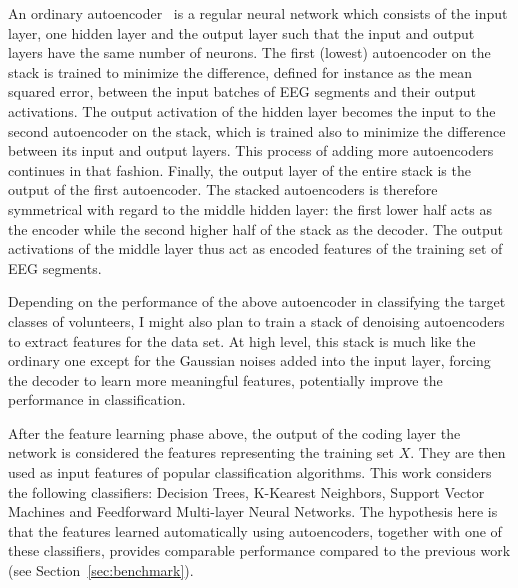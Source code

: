 \documentclass[12pt]{article}
\begin{document}
An ordinary autoencoder~\cite{bengio2007greedy} is a regular neural network which consists of the input layer, one hidden layer and the output layer such that the input and output layers have the same number of neurons. The first (lowest) autoencoder on the stack is trained to minimize the difference, defined for instance as the mean squared error, between the input batches of EEG segments and their output activations. The output activation of the hidden layer becomes the input to the second autoencoder on the stack, which is trained also to minimize the difference between its input and output layers. This process of adding more autoencoders continues in that fashion. Finally, the output layer of the entire stack is the output of the first autoencoder. The stacked autoencoders is therefore symmetrical with regard to the middle hidden layer: the first lower half acts as the encoder while the second higher half of the stack as the decoder. The output activations of the middle layer thus act as encoded features of the training set of EEG segments.

Depending on the performance of the above autoencoder in classifying the target classes of volunteers, I might also plan to train a stack of denoising autoencoders~\cite{vincent2010stacked} to extract features for the data set. At high level, this stack is much like the ordinary one except for the Gaussian noises added into the input layer, forcing the decoder to learn more meaningful features, potentially improve the performance in classification.

After the feature learning phase above, the output of the coding layer the network is considered the features representing the training set $X$. They are then used as input features of popular classification algorithms. This work considers the following classifiers: Decision Trees, K-Kearest Neighbors, Support Vector Machines and Feedforward Multi-layer Neural Networks. The hypothesis here is that the features learned automatically using autoencoders, together with one of these classifiers, provides comparable performance compared to the previous work (see Section~\ref{sec:benchmark}).
\end{document}
